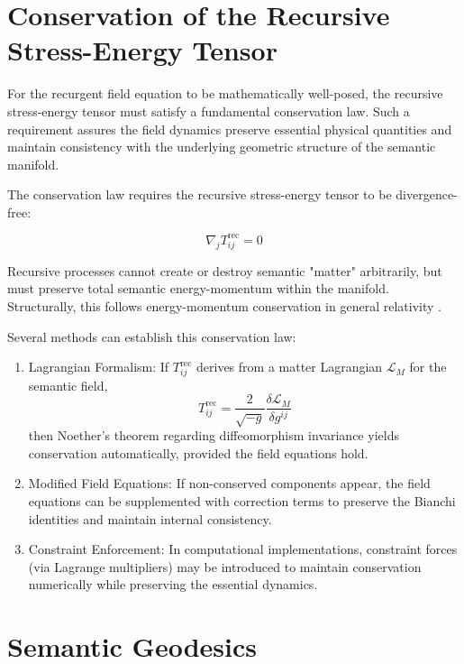 \section{Conservation of the Recursive Stress-Energy Tensor}

For the recurgent field equation to be mathematically well-posed, the recursive stress-energy tensor must satisfy a fundamental conservation law. Such a requirement assures the field dynamics preserve essential physical quantities and maintain consistency with the underlying geometric structure of the semantic manifold.

The conservation law requires the recursive stress-energy tensor to be divergence-free:

\begin{equation}
\nabla_j T^{\mathrm{rec}}_{ij} = 0
\end{equation}

Recursive processes cannot create or destroy semantic "matter" arbitrarily, but must preserve total semantic energy-momentum within the manifold. Structurally, this follows energy-momentum conservation in general relativity \autocite{MisnerThorneWheeler1973, Wald1984}.

Several methods can establish this conservation law:

\begin{enumerate}
    \item Lagrangian Formalism: If \(T^{\mathrm{rec}}_{ij}\) derives from a matter Lagrangian \(\mathcal{L}_M\) for the semantic field,
    \begin{equation}
    T^{\mathrm{rec}}_{ij} = \frac{2}{\sqrt{-g}} \frac{\delta \mathcal{L}_M}{\delta g^{ij}}
    \end{equation}
    then Noether's theorem \autocite{Noether1918} regarding diffeomorphism invariance yields conservation automatically, provided the field equations hold.
    \item Modified Field Equations: If non-conserved components appear, the field equations can be supplemented with correction terms to preserve the Bianchi identities \autocite{Bianchi1902} and maintain internal consistency.
    \item Constraint Enforcement: In computational implementations, constraint forces (via Lagrange multipliers) may be introduced to maintain conservation numerically while preserving the essential dynamics.
\end{enumerate}

\section{Semantic Geodesics}

